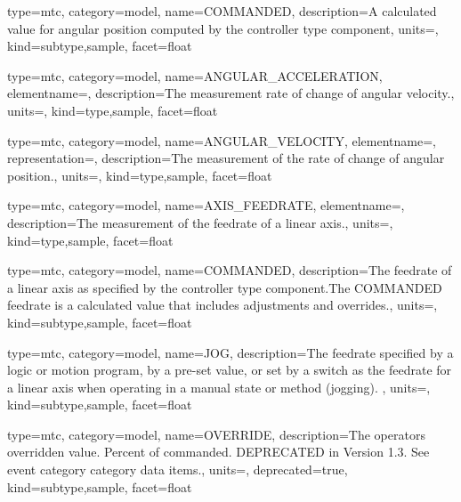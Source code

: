{
  type=mtc,
  category=model,
  name={COMMANDED},
  description={A calculated value for angular position computed by the \gls{controller} type component},
  units=,
  kind={subtype,sample},
  facet={\gls{float}}
}


{
  type=mtc,
  category=model,
  name={ANGULAR\_ACCELERATION},
  elementname=,
  description={The measurement rate of change of angular velocity.},
  units=,
  kind={type,sample},
  facet={\gls{float}}
}


{
  type=mtc,
  category=model,
  name={ANGULAR\_VELOCITY},
  elementname=,
  representation=,
  description={The measurement of the rate of change of angular position.},
  units=,
  kind={type,sample},
  facet={\gls{float}}
}


{
  type=mtc,
  category=model,
  name={AXIS\_FEEDRATE},
  elementname=,
  description={The measurement of the feedrate of a linear axis.},
  units=,
  kind={type,sample},
  facet={\gls{float}}
}


{
  type=mtc,
  category=model,
  name={COMMANDED},
  description={The feedrate of a linear axis as specified by the \gls{controller} type component.The COMMANDED feedrate is a calculated value that includes adjustments and overrides.},
  units=,
  kind={subtype,sample},
  facet={\gls{float}}
}


{
  type=mtc,
  category=model,
  name={JOG},
  description={The feedrate specified by a logic or motion program, by a pre-set value, or set by a switch as the feedrate for a linear axis when operating in a manual state or method (jogging).  },
  units=,
  kind={subtype,sample},
  facet={\gls{float}}
}


{
  type=mtc,
  category=model,
  name={OVERRIDE},
  description={The operators overridden value. Percent of commanded.  DEPRECATED in Version 1.3.   See \gls{event category} category data items.},
  units=,
  deprecated={true},
  kind={subtype,sample},
  facet={\gls{float}}
}


